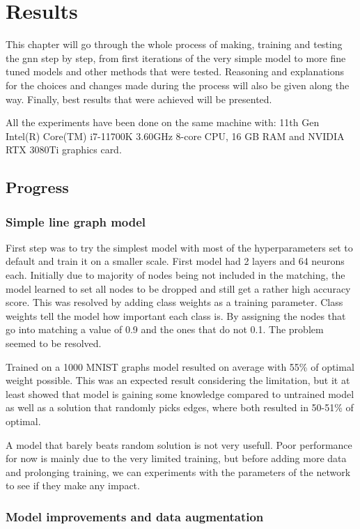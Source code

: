 \chapter{Results}

This chapter will go through the whole process of making, training and testing the \gls{gnn} step by step, from first iterations of the very simple model to more fine tuned models and other methods that were tested. Reasoning and explanations for the choices and changes made during the process will also be given along the way. Finally, best results that were achieved will be presented. 

All the experiments have been done on the same machine with: 11th Gen Intel(R) Core(TM) i7-11700K 3.60GHz 8-core CPU, 16 GB RAM and NVIDIA RTX 3080Ti graphics card.

\section{Progress}
\subsection{Simple line graph model}

First step was to try the simplest model with most of the hyperparameters set to default and train it on a smaller scale. First model had 2 layers and 64 neurons each. Initially due to majority of nodes being not included in the matching, the model learned to set all nodes to be dropped and still get a rather high accuracy score. This was resolved by adding class weights as a training parameter. Class weights tell the model how important each class is. By assigning the nodes that go into matching a value of 0.9 and the ones that do not 0.1. The problem seemed to be resolved.
 
Trained on a 1000 MNIST graphs model resulted on average with 55\% of optimal weight possible. This was an expected result considering the limitation, but it at least showed that model is gaining some knowledge compared to untrained model as well as a solution that randomly picks edges, where both resulted in 50-51\% of optimal. 

A model that barely beats random solution is not very usefull. Poor performance for now is mainly due to the very limited training, but before adding more data and prolonging training, we can experiments with the parameters of the network to see if they make any impact.

\subsection{Model improvements and data augmentation}

